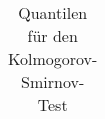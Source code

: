 \begin{table}[ht]
\begin{center}
\begin{tabular}{|r|rrr|rrr|rrr|}
\hline
\end{tabular}
\end{center}
\caption{Quantilen für den Kolmogorov-Smirnov-Test\label{KS-tabelle}
}
\end{table}

